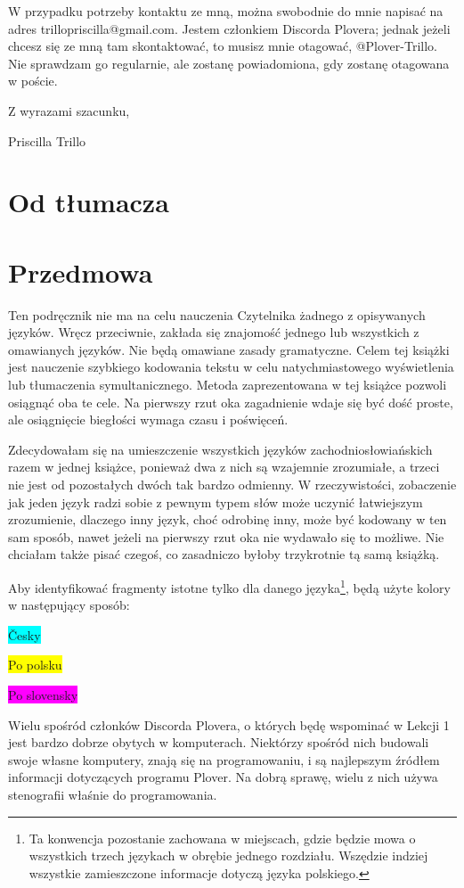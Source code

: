 \documentclass[12p, oneside]{book}
\begin{document}
W przypadku potrzeby kontaktu ze mną, można swobodnie do mnie napisać na adres trillopriscilla@gmail.com. Jestem członkiem Discorda Plovera; jednak jeżeli chcesz się ze mną tam skontaktować, to musisz mnie otagować, @Plover-Trillo. Nie sprawdzam go regularnie, ale zostanę powiadomiona, gdy zostanę otagowana w poście.


Z wyrazami szacunku,


Priscilla Trillo

\newpage
\section{Od tłumacza}

\newpage
\section{Przedmowa}
Ten podręcznik nie ma na celu nauczenia Czytelnika żadnego z opisywanych języków. Wręcz przeciwnie, zakłada się znajomość jednego lub wszystkich z omawianych języków. Nie będą omawiane zasady gramatyczne. Celem tej książki jest nauczenie szybkiego kodowania tekstu w celu natychmiastowego wyświetlenia lub tłumaczenia symultanicznego. Metoda zaprezentowana w tej książce pozwoli osiągnąć oba te cele. Na pierwszy rzut oka zagadnienie wdaje się być dość proste, ale osiągnięcie biegłości wymaga czasu i poświęceń.

Zdecydowałam się na umieszczenie wszystkich języków zachodniosłowiańskich razem w jednej książce, ponieważ dwa z nich są wzajemnie zrozumiałe, a trzeci nie jest od pozostałych dwóch tak bardzo odmienny. W rzeczywistości, zobaczenie jak jeden język radzi sobie z pewnym typem słów może uczynić łatwiejszym zrozumienie, dlaczego inny język, choć odrobinę inny, może być kodowany w ten sam sposób, nawet jeżeli na pierwszy rzut oka nie wydawało się to możliwe. Nie chciałam także pisać czegoś, co zasadniczo byłoby trzykrotnie tą samą książką.

Aby identyfikować fragmenty istotne tylko dla danego języka\footnote{Ta konwencja pozostanie zachowana w miejscach, gdzie będzie mowa o wszystkich trzech językach w obrębie jednego rozdziału. Wszędzie indziej wszystkie zamieszczone informacje dotyczą języka polskiego.}, będą użyte kolory w następujący sposób:

\colorbox{cyan}{Česky}

\colorbox{yellow}{Po polsku}

\colorbox{magenta}{Po slovensky}

Wielu spośród członków Discorda Plovera, o których będę wspominać w Lekcji 1 jest bardzo dobrze obytych w komputerach. Niektórzy spośród nich budowali swoje własne komputery, znają się na programowaniu, i są najlepszym źródłem informacji dotyczących programu Plover. Na dobrą sprawę, wielu z nich używa stenografii właśnie do programowania.
\end{document}
